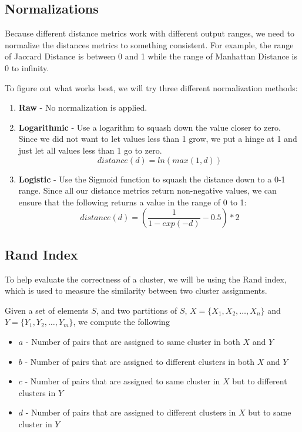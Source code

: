 \documentclass{article}
\begin{document}
   \subsection{Normalizations}
      Because different distance metrics work with different output ranges, we need to normalize the distances metrics to something consistent.
      For example, the range of Jaccard Distance is between 0 and 1 while the range of Manhattan Distance is 0 to infinity.

      To figure out what works best, we will try three different normalization methods:
      \begin{enumerate}
         \item
            \textbf{Raw} - No normalization is applied.
         
         \item
            \textbf{Logarithmic} - Use a logarithm to squash down the value closer to zero.
            Since we did not want to let values less than 1 grow, we put a hinge at 1 and just let all values less than 1 go to zero.
            $$ distance(d) = ln(max(1, d)) $$
            
         \item
            \textbf{Logistic} - Use the Sigmoid function to squash the distance down to a 0-1 range.
            Since all our distance metrics return non-negative values, we can ensure that the following returns a value in the range of 0 to 1:
            $$ distance(d) = (\frac{1}{1 - exp(-d)} - 0.5) * 2 $$
      \end{enumerate}

   \subsection{Rand Index}
      To help evaluate the correctness of a cluster, we will be using the Rand index, which is used to measure the similarity between two cluster assignments.

      Given a set of elements $S$, and two partitions of $S$, $X = \{ X_1, X_2, \ldots, X_n \}$ and $Y = \{Y_1, Y_2, \ldots, Y_m\}$, we compute the following
      \begin{itemize}
         \item $a$ - Number of pairs that are assigned to same cluster in both $X$ and $Y$
         \item $b$ - Number of pairs that are assigned to different clusters in both $X$ and $Y$
         \item $c$ - Number of pairs that are assigned to same cluster in $X$ but to different clusters in $Y$
         \item $d$ - Number of pairs that are assigned to different clusters in $X$ but to same cluster in $Y$
      \end{itemize}
\end{document}
